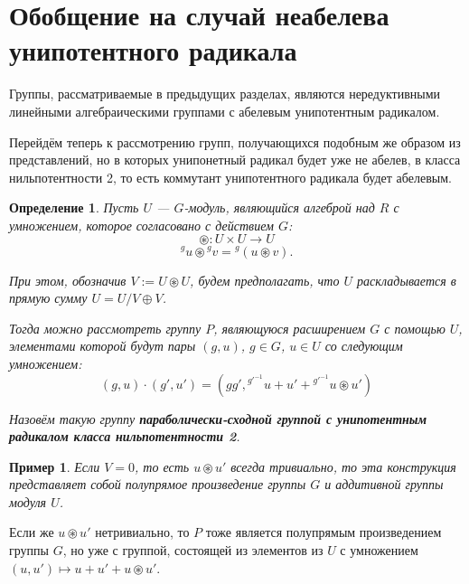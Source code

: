 \documentclass[12pt]{matmex-diploma}
\theoremstyle{mystyleni}
\theoremstyle{mystyle}
\newtheorem{example}{Пример}
\newtheorem{definition}{Определение}
\begin{document}
\pagebreak
\section{Обобщение на случай неабелева унипотентного радикала}

Группы, рассматриваемые в предыдущих разделах, являются нередуктивными линейными алгебраическими группами с абелевым унипотентным радикалом.

Перейдём теперь к рассмотрению групп, получающихся подобным же образом из представлений, но в которых унипонетный радикал будет уже не абелев, в класса нильпотентности 2, то есть коммутант унипотентного радикала будет абелевым.

\begin{framed}
\begin{definition}
Пусть $U$ --- $G$-модуль, являющийся алгеброй над $R$ с умножением, которое согласовано с действием $G$:
$$\circledast : U \times U \to U$$
$$ {}^g u \circledast {}^g v = {}^g (u \circledast v) .$$

При этом, обозначив $V:=U\circledast U$, будем предполагать, что $U$ раскладывается в прямую сумму $U = U/V \oplus V$.

Тогда можно рассмотреть группу $P$, являющуюся расширением $G$ с помощью $U$, элементами которой будут пары $(g,u)$, $g \in G$, $u \in U$ со следующим умножением:
$$
(g,u)\cdot (g',u') = (g g', {}^{g'^{-1}} u + u' + {}^{g'^{-1}} u \circledast u')
$$

Назовём такую группу \textit{\textbf{параболически-сходной группой с унипотентным радикалом класса нильпотентности 2}}.
\end{definition}
\end{framed}

\begin{example}
Если $V=0$, то есть $u \circledast u'$ всегда тривиально, то эта конструкция представляет собой полупрямое произведение группы $G$ и аддитивной группы модуля $U$.
\end{example}

Если же $u \circledast u'$ нетривиально, то $P$ тоже является полупрямым произведением группы $G$, но уже с группой, состоящей из элементов из $U$ с умножением
$
(u,u') \mapsto u + u' + u \circledast u'
$.
\end{document}
